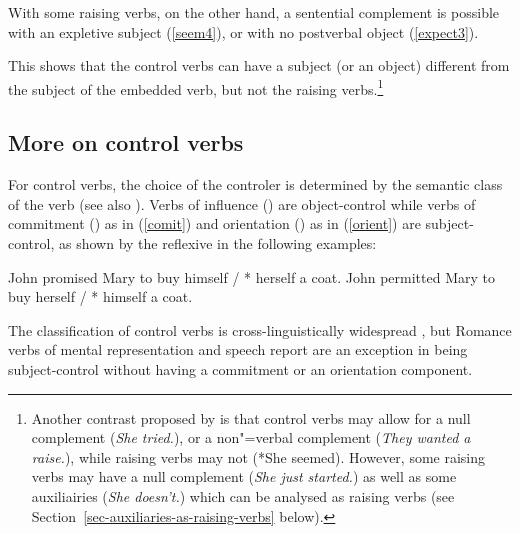 \documentclass[output=paper
	        ,collection
	        ,collectionchapter
 	        ,biblatex
                ,babelshorthands
                ,newtxmath
                ,draftmode
                ,colorlinks, citecolor=brown
]{./langsci/langscibook}
\begin{document}
\eal
{}
\zl

\eal
{}
\zl

With some raising verbs, on the other hand, a sentential complement is possible with an expletive subject (\ref{seem4}), or with no postverbal object (\ref{expect3}).

\eal
{}
\zl

This shows that the control verbs can have a subject (or an object) different from the subject of the embedded verb, but not the raising verbs.\footnote{Another contrast proposed by \citet{Jacobson1990} is that control verbs may allow for a null complement (\emph{She tried.}), or a non"=verbal complement (\emph{They wanted a raise.}), while raising verbs may not (*She seemed). However, some raising verbs may have a null complement (\emph{She just started.}) as well as some auxiliairies (\emph{She doesn't.}) which can be analysed as raising verbs (see Section~\ref{sec-auxiliaries-as-raising-verbs} below).}

\subsection{More on control verbs}

For control verbs, the choice of the controler is determined by the semantic class of the verb \citet{PollardandSag1992} (see also \citealt{JackendoffandCulicover2003}).  Verbs of influence () are object-control
while verbs of commitment () as in (\ref{comit}) and orientation () as in (\ref{orient}) are subject-control, as shown by the reflexive in the following examples:

\begin{exe}
	\ex \begin{xlist}
	\ex John promised Mary to buy himself / * herself a coat. \label{comit}
   \ex 	John permitted Mary to buy herself / * himself a coat.\label{orient}
 \end{xlist}
 \end{exe}
 
  The classification of control verbs is cross-linguistically widespread \citep{VanValinandLapolla1997}, but Romance verbs of mental representation and speech report are an exception in being subject-control without having a commitment or an orientation component.
\end{document}
